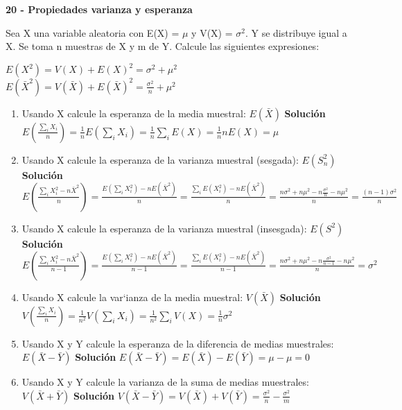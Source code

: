 \documentclass[addpoints]{exam}
\theoremstyle{mytheor}
\begin{document}
  \begin{questions}
  
  \question \textbf{20 - Propiedades varianza y esperanza}
  
Sea X una variable aleatoria con E(X) = $\mu$ y V(X) = $\sigma^2$. Y se distribuye igual a X. Se toma n muestras de X y m de Y. Calcule las siguientes expresiones:
  
  $E(X^2) = V(X)+E(X)^2 = \sigma^2 + \mu^2$ \\
  $E(\bar{X}^2) = V(\bar{X})+E(\bar{X})^2 = \frac{\sigma^2}{n} + \mu^2$

  \begin{enumerate}
  \item Usando X calcule la esperanza de la media muestral: $E(\bar{X})$
  \subitem \textbf{Solución} $E(\frac{\sum_i X_i}{n}) = \frac{1}{n}E(\sum_i X_i) = \frac{1}{n}\sum_iE(X) = \frac{1}{n}nE(X) = \mu$
  
  
  \item Usando X calcule la esperanza de la varianza muestral (sesgada): $E(S_n^2) $
  \subitem \textbf{Solución} $E(\frac{\sum_i X_i^2 - n \bar{X}^2}{n}) =\frac{E(\sum_i X_i^2) - n E(\bar{X}^2)}{n} = \frac{\sum_i E(X_i^2) - n E(\bar{X}^2)}{n} = \frac{n \sigma^2 + n \mu^2 - n \frac{\sigma^2}{n} - n \mu^2}{n} = \frac{(n-1) \sigma^2}{n} $\\  
  
  
  \item Usando X calcule la esperanza de la varianza muestral (insesgada): $E(S^2)$
  \subitem \textbf{Solución} $E(\frac{\sum_i X_i^2 - n \bar{X}^2}{n-1}) =\frac{E(\sum_i X_i^2) - n E(\bar{X}^2)}{n-1} = \frac{\sum_i E(X_i^2) - n E(\bar{X}^2)}{n-1} = \frac{n \sigma^2 + n \mu^2 - n \frac{\sigma^2}{n-1} - n \mu^2}{n} =  \sigma^2$\\  
  
  
  \item Usando X calcule la var`ianza de la media muestral: $V(\bar{X})$
  \subitem \textbf{Solución} $V(\frac{\sum_i X_i}{n}) = \frac{1}{n^2}V(\sum_i X_i) = \frac{1}{n^2}\sum_i V(X) = \frac{1}{n} \sigma^2$
  
  
  \item Usando X y Y calcule la esperanza de la diferencia de medias muestrales: $E(\bar{X} - \bar{Y})$
  \subitem \textbf{Solución} $E(\bar{X} - \bar{Y}) = E(\bar{X}) - E(\bar{Y}) = \mu - \mu = 0$
  
  
  \item Usando X y Y calcule la varianza de la suma de medias muestrales: $V(\bar{X} + \bar{Y})$
  \subitem \textbf{Solución} $V(\bar{X} - \bar{Y}) = V(\bar{X}) + V(\bar{Y}) = \frac{\sigma^2}{n} - \frac{\sigma^2}{m}$
  

\end{enumerate}
\end{questions}
\end{document}
